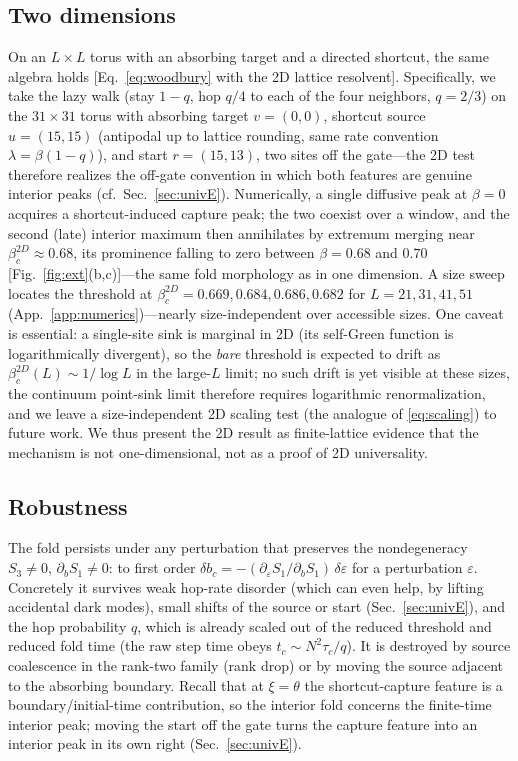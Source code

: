\documentclass[reprint,amsmath,amssymb,aps,prresearch,longbibliography]{revtex4-2}
\begin{document}
\subsection{Two dimensions}\label{sec:univC}
On an $L\times L$ torus with an absorbing target and a directed shortcut, the same algebra holds
[Eq.~\eqref{eq:woodbury} with the 2D lattice resolvent]. Specifically, we take the lazy walk (stay
$1-q$, hop $q/4$ to each of the four neighbors, $q=2/3$) on the $31\times31$ torus with absorbing
target $v=(0,0)$, shortcut source $u=(15,15)$ (antipodal up to lattice rounding, same rate convention
$\lambda=\beta(1-q)$), and start $r=(15,13)$, two sites off the gate---the 2D test therefore realizes
the off-gate convention in which both features are genuine interior peaks (cf.\
Sec.~\ref{sec:univE}). Numerically, a single diffusive
peak at $\beta=0$ acquires a shortcut-induced capture peak; the two coexist over a window, and the
second (late) interior maximum then annihilates by extremum merging near $\beta_c^{2D}\approx0.68$,
its prominence falling to zero between $\beta=0.68$ and $0.70$ [Fig.~\ref{fig:ext}(b,c)]---the same
fold morphology as in one dimension. A size sweep locates the threshold at
$\beta_c^{2D}=0.669,0.684,0.686,0.682$ for $L=21,31,41,51$ (App.~\ref{app:numerics})---nearly
size-independent over accessible sizes. One caveat is essential:
a single-site sink is marginal in 2D (its self-Green function is logarithmically divergent), so the
\emph{bare} threshold is expected to drift as $\beta_c^{2D}(L)\sim1/\log L$ in the large-$L$ limit;
no such drift is yet visible at these sizes, the continuum point-sink
limit therefore requires logarithmic renormalization, and we leave a size-independent 2D scaling test
(the analogue of \eqref{eq:scaling}) to future work. We thus present the 2D result as finite-lattice
evidence that the mechanism is not one-dimensional, not as a proof of 2D universality.

\subsection{Robustness}\label{sec:univD}
The fold persists under any perturbation that preserves the nondegeneracy $S_3\neq0$,
$\partial_b S_1\neq0$: to first order $\delta b_c=-(\partial_\varepsilon S_1/\partial_b S_1)\,
\delta\varepsilon$ for a perturbation $\varepsilon$. Concretely it survives weak hop-rate disorder
(which can even help, by lifting accidental dark modes), small shifts of the source or start
(Sec.~\ref{sec:univE}), and the hop probability $q$, which is already scaled out of the reduced
threshold and
reduced fold time (the raw step time obeys $t_c\sim N^2\tau_c/q$). It is destroyed by source
coalescence in the rank-two family (rank drop) or by moving the source
adjacent to the absorbing boundary. Recall that at $\xi=\theta$ the shortcut-capture feature is a
boundary/initial-time contribution, so the interior fold concerns the finite-time interior
peak; moving the start off the gate turns the capture feature into an interior peak in its own right
(Sec.~\ref{sec:univE}).
\end{document}
